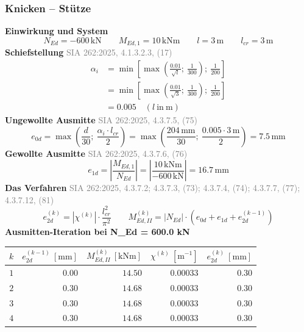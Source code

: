 \documentclass[11pt,a4paper]{article}
\newcommand{\normref}[1]{{\small\textcolor{gray}{#1}}}
\begin{document}
\subsubsection{Knicken – Stütze}
\noindent\textbf{Einwirkung und System}
\begin{equation*}
N_{Ed} = -600\,\mathrm{kN} \qquad M_{Ed,1} = 10\,\mathrm{kNm} \qquad l = 3\,\mathrm{m} \qquad l_{cr} = 3\,\mathrm{m}
\end{equation*}
\noindent\textbf{Schiefstellung} \hfill \normref{SIA 262:2025, 4.1.3.2.3, (17)}
\begin{equation*}
\begin{aligned}
  \alpha_i &= \min\left[\max\left(\frac{0.01}{\sqrt{l}};\ \frac{1}{300}\right);\ \frac{1}{200}\right] \\
  &= \min\left[\max\left(\frac{0.01}{\sqrt{3}};\ \frac{1}{300}\right);\ \frac{1}{200}\right] \\
  &= 0.005 \quad \left(l\ \text{in}\ \mathrm{m}\right)
\end{aligned}
\end{equation*}
\noindent\textbf{Ungewollte Ausmitte} \hfill \normref{SIA 262:2025, 4.3.7.5, (75)}
\begin{equation*}
e_{0d} = \max\left(\frac{d}{30};\ \frac{\alpha_i \cdot l_{cr}}{2}\right) = \max\left(\frac{204\,\mathrm{mm}}{30};\ \frac{0.005 \cdot 3\,\mathrm{m}}{2}\right) = 7.5\,\mathrm{mm}
\end{equation*}
\noindent\textbf{Gewollte Ausmitte} \hfill \normref{SIA 262:2025, 4.3.7.6, (76)}
\begin{equation*}
e_{1d} = \left|\frac{M_{Ed,1}}{N_{Ed}}\right| = \left|\frac{10\,\mathrm{kNm}}{-600\,\mathrm{kN}}\right| = 16.7\,\mathrm{mm}
\end{equation*}
\noindent\textbf{Das Verfahren} \hfill \normref{SIA 262:2025, 4.3.7.2; 4.3.7.3, (73); 4.3.7.4, (74); 4.3.7.7, (77); 4.3.7.12, (81)}
\begin{equation*}
e_{2d}^{(k)} = \left|\chi^{(k)}\right| \cdot \frac{l_{cr}^{2}}{\pi^{2}} \qquad M_{Ed,II}^{(k)} = \left|N_{Ed}\right| \cdot \left(e_{0d} + e_{1d} + e_{2d}^{(k-1)}\right)
\end{equation*}
\noindent\textbf{Ausmitten-Iteration bei N\_Ed = 600.0 kN}
\begin{longtable}{rrrrr}
\hline
$k$ & $e_{2d}^{(k-1)}\ [\mathrm{mm}]$ & $M_{Ed,II}^{(k)}\ [\mathrm{kNm}]$ & $\chi^{(k)}\ [\mathrm{m}^{-1}]$ & $e_{2d}^{(k)}\ [\mathrm{mm}]$ \\
\hline
\endhead
$1$ & $0.00$ & $14.50$ & $0.00033$ & $0.30$ \\
$2$ & $0.30$ & $14.68$ & $0.00033$ & $0.30$ \\
$3$ & $0.30$ & $14.68$ & $0.00033$ & $0.30$ \\
$4$ & $0.30$ & $14.68$ & $0.00033$ & $0.30$ \\
\hline
\end{longtable}
\end{document}

